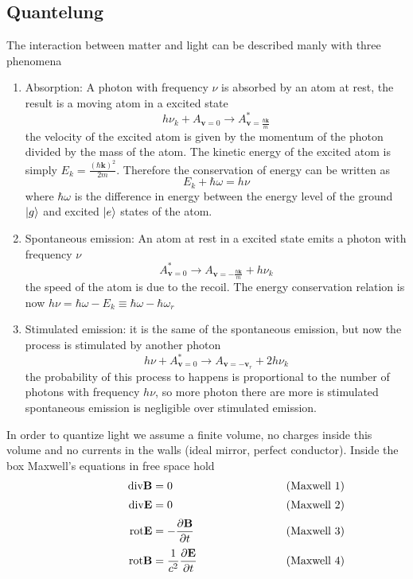 \documentclass[12pt]{article}
\theoremstyle{plain}
\renewcommand{\k}{\mathbf{k}}
\theoremstyle{definition}
\theoremstyle{remark}
\begin{document}
\subsection{Quantelung}
The interaction between matter and light can be described manly with three phenomena 
\begin{enumerate}[(1)]
\item Absorption: A photon with frequency $\nu$ is absorbed by an atom at rest, the result is a moving atom in a excited state
\begin{equation}h\nu_{k} + A_{\mathbf{v}=0} \longrightarrow A^*_{\mathbf{v}=\frac{\hbar \k}{m}}\end{equation}
the velocity of the excited atom is given by the momentum of the photon divided by the mass of the atom. The kinetic energy of the excited atom is simply $E_k = \frac{(\hbar \k)^2}{2m}$. Therefore the conservation of energy can be written as
\begin{equation}E_k +\hbar \omega = h\nu\end{equation}
where $\hbar \omega$ is the difference in energy between the energy level of the ground $\ket{g}$ and excited $\ket{e}$ states of the atom.
\item Spontaneous emission: An atom at rest in a excited state emits a photon with frequency $\nu$
\begin{equation}A^*_{\mathbf{v}=0} \longrightarrow A_{\mathbf{v}=-\frac{\hbar \k}{m}} + h \nu_k\end{equation}
the speed of the atom is due to the recoil. The energy conservation relation is now $h\nu=\hbar\omega-E_k \equiv \hbar \omega -\hbar \omega_r $
\item Stimulated emission: it is the same of the spontaneous emission, but now the process is stimulated by another photon
\begin{equation}h\nu + A^*_{\mathbf{v}=0} \longrightarrow A_{\mathbf{v}=-\mathbf{v}_r} + 2 h \nu_k\end{equation}
the probability of this process to happens is proportional to the number of photons  with frequency $h\nu$, so more photon there are more is stimulated spontaneous emission is negligible over stimulated emission.
\end{enumerate}
In order to quantize light we assume a finite volume, no charges inside this volume and no currents in the walls (ideal mirror, perfect conductor). Inside the box Maxwell's equations in free space hold
\[
    \begin{alignedat}{3}
        & & \text{div}\mathbf{B} &=0 & \hskip8em &\text{\rlap{(Maxwell 1)}} \\[0.5ex]
        & & \text{div}\mathbf{E} &=0 & &\text{\rlap{(Maxwell 2)}} \\[0.5ex]
        & &\text{rot}\mathbf{E} &=-\frac{\partial \mathbf{B}}{\partial t} & &\text{\rlap{(Maxwell 3)}} \\[0.5ex]
        & & \text{rot}\mathbf{B} &=\frac{1}{c^2}\frac{\partial \mathbf{E}}{\partial t} & &\text{\rlap{(Maxwell 4)}}
    \end{alignedat}
\]
\end{document}
